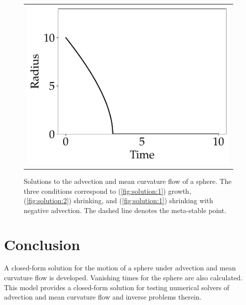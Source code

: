 \documentclass[journal]{IEEEtran}
\begin{document}
\begin{figure}[t]
\begin{tabular}{c}
{      \includegraphics[width=0.85\linewidth]{solution_3}%
      \label{fig:solution:3}
    }
  \end{tabular}
  \caption{Solutions to the advection and mean curvature flow of a sphere. The three conditions correspond to (\ref{fig:solution:1}) growth, (\ref{fig:solution:2}) shrinking, and (\ref{fig:solution:1}) shrinking with negative advection. The dashed line denotes the meta-stable point.}
  \label{fig:solution}
\end{figure}

\section{Conclusion}
A closed-form solution for the motion of a sphere under advection and mean curvature flow is developed.
Vanishing times for the sphere are also calculated.
This model provides a closed-form solution for testing numerical solvers of advection and mean curvature flow and inverse problems therein.


%
\end{document}

